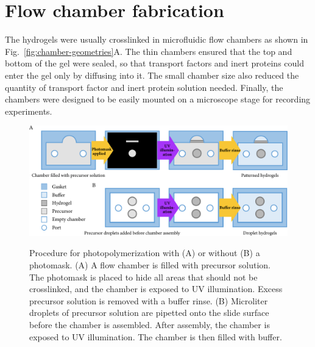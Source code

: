




\section{Flow chamber fabrication}
\label{sec:flow-chambers}

The hydrogels were usually crosslinked in microfluidic flow chambers as shown in Fig.~\ref{fig:chamber-geometries}A.  The thin chambers ensured that the top and bottom of the gel were sealed, so that transport factors and inert proteins could enter the gel only by diffusing into it.  The small chamber size also reduced the quantity of transport factor and inert protein solution needed.  Finally, the chambers were designed to be easily mounted on a microscope stage for recording experiments.

\begin{figure}
\caption[Photopolymerization with and without photomasks.]{Procedure for photopolymerization with (A) or without (B) a photomask. (A) A flow chamber is filled with precursor solution.  The photomask is placed to hide all areas that should not be crosslinked, and the chamber is exposed to UV illumination.  Excess precursor solution is removed with a buffer rinse. (B) Microliter droplets of precursor solution are pipetted onto the slide surface before the chamber is assembled.  After assembly, the chamber is exposed to UV illumination.  The chamber is then filled with buffer.}
\centering
\includegraphics[width=\textwidth]{figs/ch03/photomask}
\label{fig:photomask}
\end{figure}

